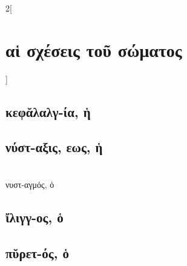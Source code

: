 \documentclass{book}
\begin{document}
\begin{multicols}{2}[\section{αἱ σχέσεις τοῦ σώματος}]
\subsection{κεφᾰλαλγ-ία, ἡ}
\subsection{νύστ-αξις, εως, ἡ}  ~\\
νυστ-αγμός, ὁ 
\subsection{ἴλιγγ-ος, ὁ} 
\subsection{πῠρετ-ός, ὁ}
~
\end{multicols}
\newpage
\end{document}
